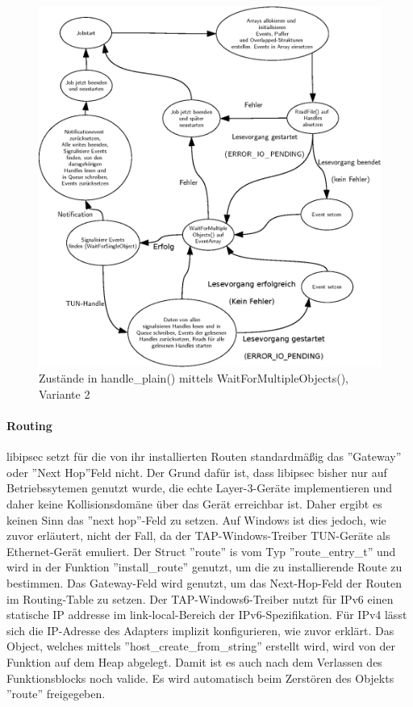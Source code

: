 {\begin{figure}
\centering
\def\svgwidth{\columnwidth}
\includegraphics[width=\textwidth]{WaitForMultipleObjects2.eps}
\caption{Zustände in handle\_plain() mittels WaitForMultipleObjects(), Variante 2}
\label{fig:WaitForMultipleObjects2}
\end{figure}

\paragraph{Routing}
libipsec setzt für die von ihr installierten Routen standardmäßig das ''Gateway''
oder ''Next Hop''Feld nicht. Der Grund dafür ist, dass libipsec bisher nur auf
Betriebssytemen genutzt wurde, die echte Layer-3-Geräte implementieren und
daher keine Kollisionsdomäne über das Gerät erreichbar ist. Daher ergibt es keinen
Sinn das ''next hop''-Feld zu setzen.
Auf Windows ist dies jedoch, wie zuvor erläutert, nicht der Fall, da der TAP-Windows-Treiber
TUN-Geräte als Ethernet-Gerät emuliert.
Der Struct ''route'' is vom Typ ''route\_entry\_t'' und wird in der Funktion
''install\_route'' genutzt, um die zu installierende Route zu bestimmen.
Das Gateway-Feld wird genutzt, um das Next-Hop-Feld der Routen im Routing-Table
zu setzen. 
Der TAP-Windows6-Treiber nutzt für IPv6 einen statische IP addresse im link-local-Bereich
der IPv6-Spezifikation.
Für IPv4 lässt sich die IP-Adresse des Adapters implizit konfigurieren, wie zuvor erklärt.
Das Object, welches mittels ''host\_create\_from\_string'' erstellt wird,
wird von der Funktion auf dem Heap abgelegt. Damit ist es auch nach dem Verlassen
des Funktionsblocks noch valide. Es wird automatisch beim Zerstören des Objekts
''route'' freigegeben.

}
